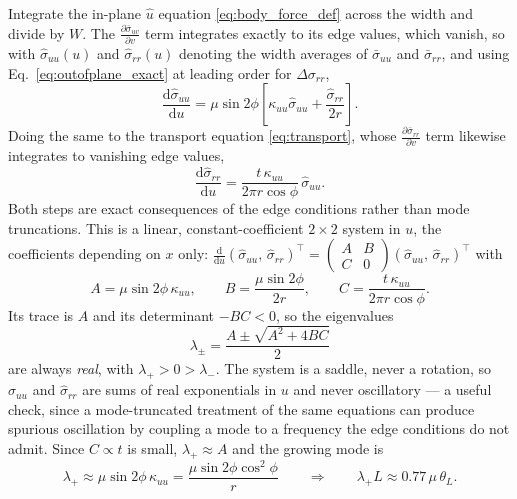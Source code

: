\documentclass[11pt]{article}
\begin{document}
Integrate the in-plane $\hat u$ equation \eqref{eq:body_force_def} across the
width and divide by $W$. The $\frac{\partial \bar\sigma_{uv}}{\partial v}$ term
integrates exactly to its edge values, which vanish, so with
$\hat\sigma_{uu}(u)$ and $\hat\sigma_{rr}(u)$ denoting the width averages of
$\bar\sigma_{uu}$ and $\bar\sigma_{rr}$, and using
Eq.~\eqref{eq:outofplane_exact} at leading order for $\Delta\sigma_{rr}$,
\begin{equation}\label{eq:width_avg_u}
    \frac{\mathrm d \hat\sigma_{uu}}{\mathrm d u}
    = \mu\sin 2\phi\left[\kappa_{uu}\hat\sigma_{uu}
      + \frac{\hat\sigma_{rr}}{2r}\right].
\end{equation}
Doing the same to the transport equation \eqref{eq:transport}, whose
$\frac{\partial \bar\sigma_{rr}}{\partial v}$ term likewise integrates to
vanishing edge values,
\begin{equation}\label{eq:width_avg_S}
    \frac{\mathrm d \hat\sigma_{rr}}{\mathrm d u}
    = \frac{t\,\kappa_{uu}}{2\pi r\cos\phi}\,\hat\sigma_{uu}.
\end{equation}
Both steps are exact consequences of the edge conditions rather than mode
truncations. This is a linear, constant-coefficient $2\times2$ system in $u$, the
coefficients depending on $x$ only:
$\frac{\mathrm d}{\mathrm d u}
\left(\hat\sigma_{uu},\, \hat\sigma_{rr}\right)^{\!\top}
= \begin{pmatrix} A & B \\ C & 0\end{pmatrix}
\left(\hat\sigma_{uu},\, \hat\sigma_{rr}\right)^{\!\top}$ with
\begin{equation}\label{eq:ABC}
    A = \mu\sin 2\phi\,\kappa_{uu}, \qquad
    B = \frac{\mu\sin 2\phi}{2r}, \qquad
    C = \frac{t\,\kappa_{uu}}{2\pi r\cos\phi}.
\end{equation}
Its trace is $A$ and its determinant $-BC < 0$, so the eigenvalues
\begin{equation}\label{eq:eigen}
    \lambda_{\pm} = \frac{A \pm \sqrt{A^{2} + 4BC}}{2}
\end{equation}
are always \emph{real}, with $\lambda_{+} > 0 > \lambda_{-}$. The system is a
saddle, never a rotation, so $\hat\sigma_{uu}$ and $\hat\sigma_{rr}$ are sums of real
exponentials in $u$ and never oscillatory --- a useful check, since a
mode-truncated treatment of the same equations can produce spurious oscillation
by coupling a mode to a frequency the edge conditions do not admit. Since
$C \propto t$ is small, $\lambda_{+} \approx A$ and the growing mode is
\begin{equation}\label{eq:lambda_plus}
    \boxed{\;\lambda_{+} \approx \mu\sin 2\phi\,\kappa_{uu}
      = \frac{\mu\sin 2\phi\cos^{2}\phi}{r}
    \qquad\Longrightarrow\qquad
    \lambda_{+}L \approx 0.77\,\mu\,\theta_L.\;}
\end{equation}
\end{document}
